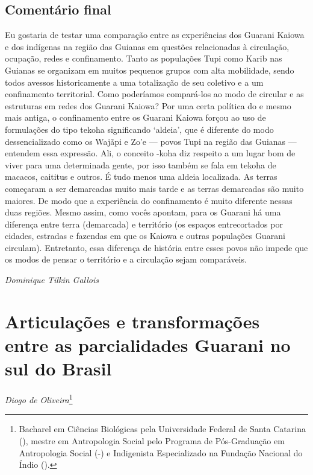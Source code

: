 \section{Comentário final}
Eu gostaria de testar uma comparação entre as experiências dos Guarani
Kaiowa e dos indígenas na região das Guianas em questões relacionadas à
circulação, ocupação, redes e confinamento. Tanto as populações Tupi
como Karib nas Guianas se organizam em muitos pequenos grupos com alta
mobilidade, sendo todos avessos historicamente a uma totalização de seu
coletivo e a um confinamento territorial. Como poderíamos compará-los
ao modo de circular e as estruturas em redes dos Guarani Kaiowa? Por
uma certa política do  e mesmo mais antiga, o confinamento entre os
Guarani Kaiowa forçou ao uso de formulações do tipo tekoha significando
‘aldeia’, que é diferente do modo dessencializado como os Wajãpi e Zo’e
— povos Tupi na região das Guianas — entendem essa expressão. Ali, o
conceito -koha diz respeito a um lugar bom de viver para uma
determinada gente, por isso também se fala em tekoha de macacos,
caititus e outros. É tudo menos uma aldeia localizada. As terras
começaram a ser demarcadas muito mais tarde e as terras demarcadas são
muito maiores. De modo que a experiência do confinamento é muito
diferente nessas duas regiões. Mesmo assim, como vocês apontam, para os
Guarani há uma diferença entre terra (demarcada) e território (os
espaços entrecortados por cidades, estradas e fazendas em que os Kaiowa
e outras populações Guarani circulam). Entretanto, essa diferença de
história entre esses povos não impede que os modos de pensar o
território e a circulação sejam comparáveis. 
\medskip
\begin{flushright}
\emph{Dominique Tilkin Gallois}
\end{flushright}

\chapter{Articulações e transformações entre as parcialidades Guarani no sul do
Brasil}
\begin{flushright}
\emph{Diogo de Oliveira}\footnote{Bacharel em Ciências Biológicas pela Universidade Federal de Santa Catarina (),
mestre em Antropologia Social pelo Programa de Pós-Graduação em Antropologia Social (-) e Indigenista
Especializado na Fundação Nacional do Índio ().}
\end{flushright}

